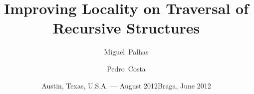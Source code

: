 
\title[Improving Locality]{Improving Locality on Traversal of Recursive Structures}

\author[M. Palhas \and P. Costa]{Miguel~Palhas \and Pedro~Costa}

\date{Austin, Texas, U.S.A. --- August 2012}

\subject{Summer Internship}




\date{Braga, June 2012}